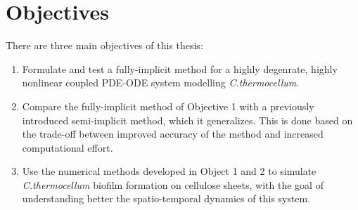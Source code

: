 \section{Objectives}

There are three main objectives of this thesis:
\begin{enumerate}
  \item Formulate and test a fully-implicit method for a highly degenrate, highly nonlinear coupled PDE-ODE system modelling \textit{C.thermocellum}.
  \item Compare the fully-implicit method of Objective 1 with a previously introduced semi-implicit method, which it generalizes.
    This is done based on the trade-off between improved accuracy of the method and increased computational effort.
  \item Use the numerical methods developed in Object 1 and 2 to simulate \textit{C.thermocellum} biofilm formation on cellulose sheets, with the goal of understanding better the spatio-temporal dynamics of this system.
%  
%  
\end{enumerate}


